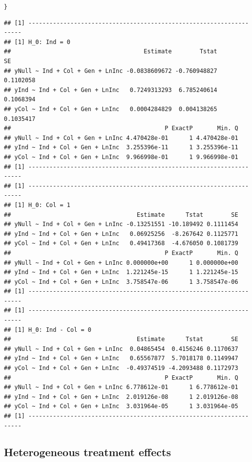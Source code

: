\documentclass[11pt, a4paper]{article}\usepackage[]{graphicx}\usepackage[]{color}
\makeatletter
\newcommand{\hlstd}[1]{\textcolor[rgb]{0.345,0.345,0.345}{#1}}%
\newenvironment{kframe}{%
 \def\at@end@of@kframe{}%
 \ifinner\ifhmode%
  \def\at@end@of@kframe{\end{minipage}}%
  \begin{minipage}{\columnwidth}%
 \fi\fi%
 \def\FrameCommand##1{\hskip\@totalleftmargin \hskip-\fboxsep
 \colorbox{shadecolor}{##1}\hskip-\fboxsep
     \hskip-\linewidth \hskip-\@totalleftmargin \hskip\columnwidth}%
 \MakeFramed {\advance\hsize-\width
   \@totalleftmargin\z@ \linewidth\hsize
   \@setminipage}}%
 {\par\unskip\endMakeFramed%
 \at@end@of@kframe}
\newenvironment{knitrout}{}{} %
\makeatother
\begin{document}
\begin{knitrout}
\begin{kframe}
\begin{alltt}
    \hlstd{\}}
\end{alltt}
\begin{verbatim}
## [1] --------------------------------------------------------------------
## [1] H_0: Ind = 0
##                                      Estimate        Tstat        SE
## yNull ~ Ind + Col + Gen + LnInc -0.0838609672 -0.760948827 0.1102058
## yInd ~ Ind + Col + Gen + LnInc   0.7249313293  6.785240614 0.1068394
## yCol ~ Ind + Col + Gen + LnInc   0.0004284829  0.004138265 0.1035417
##                                            P ExactP       Min. Q
## yNull ~ Ind + Col + Gen + LnInc 4.470428e-01      1 4.470428e-01
## yInd ~ Ind + Col + Gen + LnInc  3.255396e-11      1 3.255396e-11
## yCol ~ Ind + Col + Gen + LnInc  9.966998e-01      1 9.966998e-01
## [1] --------------------------------------------------------------------
## [1] --------------------------------------------------------------------
## [1] H_0: Col = 1
##                                    Estimate      Tstat        SE
## yNull ~ Ind + Col + Gen + LnInc -0.13251551 -10.189492 0.1111454
## yInd ~ Ind + Col + Gen + LnInc   0.06925256  -8.267642 0.1125771
## yCol ~ Ind + Col + Gen + LnInc   0.49417368  -4.676050 0.1081739
##                                            P ExactP       Min. Q
## yNull ~ Ind + Col + Gen + LnInc 0.000000e+00      1 0.000000e+00
## yInd ~ Ind + Col + Gen + LnInc  1.221245e-15      1 1.221245e-15
## yCol ~ Ind + Col + Gen + LnInc  3.758547e-06      1 3.758547e-06
## [1] --------------------------------------------------------------------
## [1] --------------------------------------------------------------------
## [1] H_0: Ind - Col = 0
##                                    Estimate      Tstat        SE
## yNull ~ Ind + Col + Gen + LnInc  0.04865454  0.4156246 0.1170637
## yInd ~ Ind + Col + Gen + LnInc   0.65567877  5.7018178 0.1149947
## yCol ~ Ind + Col + Gen + LnInc  -0.49374519 -4.2093488 0.1172973
##                                            P ExactP       Min. Q
## yNull ~ Ind + Col + Gen + LnInc 6.778612e-01      1 6.778612e-01
## yInd ~ Ind + Col + Gen + LnInc  2.019126e-08      1 2.019126e-08
## yCol ~ Ind + Col + Gen + LnInc  3.031964e-05      1 3.031964e-05
## [1] --------------------------------------------------------------------
\end{verbatim}
\end{kframe}
\end{knitrout}

    \subsection{Heterogeneous treatment effects}
\end{document}
